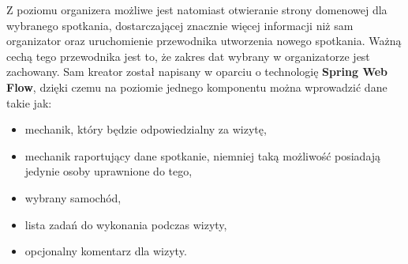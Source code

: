 Z poziomu organizera możliwe jest natomiast otwieranie strony domenowej dla wybranego spotkania, dostarczającej znacznie więcej informacji niż sam organizator oraz uruchomienie przewodnika utworzenia nowego spotkania. Ważną cechą tego przewodnika jest to, że zakres dat wybrany w organizatorze jest zachowany. Sam kreator został napisany w oparciu o technologię \textbf{Spring Web Flow}, dzięki czemu na poziomie jednego komponentu można wprowadzić dane takie jak: 
\begin{itemize}
	\item mechanik, który będzie odpowiedzialny za wizytę,
	\item mechanik raportujący dane spotkanie, niemniej taką możliwość posiadają jedynie osoby uprawnione do tego,
	\item wybrany samochód,
	\item lista zadań do wykonania podczas wizyty,
	\item opcjonalny komentarz dla wizyty.
\end{itemize}